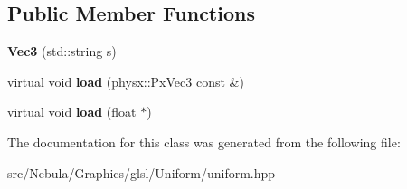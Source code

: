 \subsection*{\-Public \-Member \-Functions}
\begin{DoxyCompactItemize}
\item 
\hypertarget{classNeb_1_1glsl_1_1Uniform_1_1Scalar_1_1Vec3_a00e17308113063b4413ea425ddf975ad}{{\bfseries \-Vec3} (std\-::string s)}\label{classNeb_1_1glsl_1_1Uniform_1_1Scalar_1_1Vec3_a00e17308113063b4413ea425ddf975ad}

\item 
\hypertarget{classNeb_1_1glsl_1_1Uniform_1_1Scalar_1_1Vec3_a5713aa74fb8e57849ce10f0f9ecf51b2}{virtual void {\bfseries load} (physx\-::\-Px\-Vec3 const \&)}\label{classNeb_1_1glsl_1_1Uniform_1_1Scalar_1_1Vec3_a5713aa74fb8e57849ce10f0f9ecf51b2}

\item 
\hypertarget{classNeb_1_1glsl_1_1Uniform_1_1Scalar_1_1Vec3_a9f1c31a52a7dc684222d051cb58cdc95}{virtual void {\bfseries load} (float $\ast$)}\label{classNeb_1_1glsl_1_1Uniform_1_1Scalar_1_1Vec3_a9f1c31a52a7dc684222d051cb58cdc95}

\end{DoxyCompactItemize}


\-The documentation for this class was generated from the following file\-:\begin{DoxyCompactItemize}
\item 
src/\-Nebula/\-Graphics/glsl/\-Uniform/uniform.\-hpp\end{DoxyCompactItemize}
